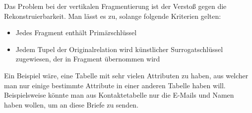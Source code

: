 Das Problem bei der vertikalen Fragmentierung ist der Verstoß gegen die Rekonstruierbarkeit. Man lässt es zu, solange folgende Kriterien gelten:

\begin{itemize}
	\item Jedes Fragment enthält Primärschlüssel
	\item Jedem Tupel der Originalrelation wird künstlicher Surrogatschlüssel zugewiesen, der in Fragment übernommen wird
\end{itemize}

Ein Beispiel wäre, eine Tabelle mit sehr vielen Attributen zu haben, aus welcher man nur einige bestimmte Attribute in einer anderen Tabelle haben will. Beispielsweise könnte man aus Kontaktetabelle nur die E-Mails und Namen haben wollen, um an diese Briefe zu senden.